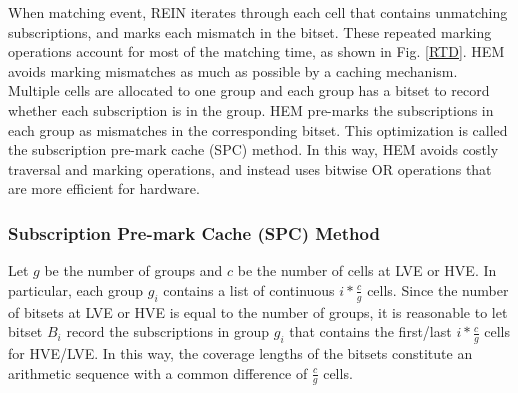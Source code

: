 \documentclass[runningheads]{llncs}
\begin{document}
When matching event, REIN \cite{REIN} iterates through each cell that contains unmatching subscriptions, and marks each mismatch in the bitset. These repeated marking operations account for most of the matching time, as shown in Fig. \ref{RTD}. 
HEM avoids marking mismatches as much as possible by a caching mechanism. Multiple cells are allocated to one group and each group has a bitset to record whether each subscription is in the group. HEM pre-marks the subscriptions in each group as mismatches in the corresponding bitset. This optimization is called the subscription pre-mark cache (SPC) method.
In this way, HEM avoids costly traversal and marking operations, and instead uses bitwise OR operations that are more efficient for hardware. 

\subsubsection{Subscription Pre-mark Cache (SPC) Method}

Let $g$ be the number of groups and $c$ be the number of cells at LVE or HVE. 
In particular, each group $g_i$ contains a list of continuous $i*\frac{c}{g}$ cells. Since the number of bitsets at LVE or HVE is equal to the number of groups, it is reasonable to let bitset $B_i$ record the subscriptions in group $g_i$ that contains the first/last $i*\frac{c}{g}$ cells for HVE/LVE. In this way, the coverage lengths of the bitsets constitute an arithmetic sequence with a common difference of $\frac{c}{g}$ cells. 
\end{document}
